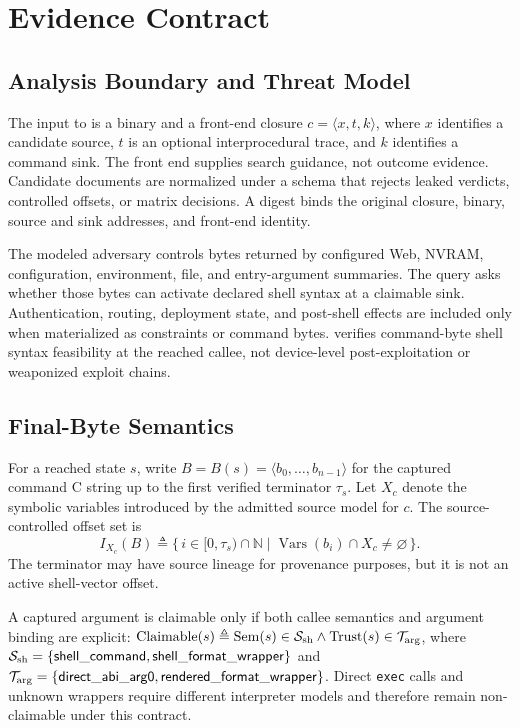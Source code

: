 \section{Evidence Contract}
\label{sec:contract}

\subsection{Analysis Boundary and Threat Model}

The input to \tool is a binary and a front-end closure
$c=\langle x,t,k\rangle$, where $x$ identifies a candidate source, $t$ is an
optional interprocedural trace, and $k$ identifies a command sink. The front
end supplies search guidance, not outcome evidence. Candidate documents are
normalized under a schema that rejects leaked verdicts, controlled offsets,
or matrix decisions. A digest binds the original closure, binary, source and
sink addresses, and front-end identity.

The modeled adversary controls bytes returned by configured Web, NVRAM,
configuration, environment, file, and entry-argument summaries. The query asks
whether those bytes can activate declared shell syntax at a claimable sink.
Authentication, routing, deployment state, and post-shell effects are included
only when materialized as constraints or command bytes. \tool verifies command-byte shell syntax feasibility at the reached callee, not device-level post-exploitation or weaponized exploit chains.

\subsection{Final-Byte Semantics}

For a reached state $s$, write
$B=B(s)=\langle b_0,\ldots,b_{n-1}\rangle$ for the captured command C string up
to the first verified terminator $\tau_s$. Let $X_c$ denote the symbolic
variables introduced by the admitted source model for $c$. The source-controlled
offset set is
\begin{equation}
I_{X_c}(B)\triangleq
\{\,i\in[0,\tau_s)\cap\mathbb N\mid
  \operatorname{Vars}(b_i)\cap X_c\neq\varnothing\,\}.
\label{eq:controlled-offsets}
\end{equation}
The terminator may have source lineage for provenance purposes, but it is not
an active shell-vector offset.

A captured argument is claimable only if both callee semantics and argument
binding are explicit: $\operatorname{Claimable}(s)\triangleq\operatorname{Sem}(s)\in\mathcal{S}_{\rm sh}\land\operatorname{Trust}(s)\in\mathcal{T}_{\rm arg}$,
where $\mathcal{S}_{\rm sh}=\{\mathsf{shell\_command},\mathsf{shell\_format\_wrapper}\}$
and $\mathcal{T}_{\rm arg}=\{\mathsf{direct\_abi\_arg0},\mathsf{rendered\_format\_wrapper}\}$.
Direct \texttt{exec} calls and unknown wrappers require different interpreter
models and therefore remain non-claimable under this contract.


